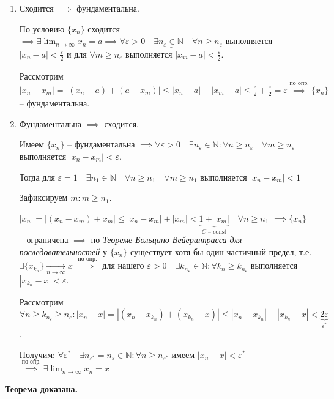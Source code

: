\documentclass[a4paper,oneside]{article}
\newcommand{\bydef}{\stackrel{\text{по опр.}}{\implies}} %
\newcommand{\dslim}{\displaystyle\lim}
\newcommand{\dslimn}{\dslim_{n \to \infty}}
\begin{document}
\begin{enumerate}
    \item Сходится $\implies$ фундаментальна.
    
    По условию $\{x_n\}$ сходится $\implies \exists \dslimn x_n = a
    \implies \underline{\forall \varepsilon > 0 \quad \exists n_\varepsilon \in \mathbb{N} \quad \forall n \ge n_\varepsilon}$
    выполняется $|x_n - a| < \frac{\varepsilon}{2}$ и для $\underline{\forall m \ge n_\varepsilon}$ 
    выполняется $|x_m - a| < \frac{\varepsilon}{2}$.

    Рассмотрим $\underline{|x_n - x_m|} = |(x_n - a) + (a - x_m)| 
    \le |x_n - a| + |x_m - a| \le \frac{\varepsilon}{2} + \frac{\varepsilon}{2} = \varepsilon
    \bydef \{x_n\}$ -- фундаментальна.

    \item Фундаментальна $\implies$ сходится.
    
    Имеем $\{x_n\}$ -- фундаментальна 
    $\implies \forall \varepsilon > 0 \quad \exists n_\varepsilon \in \mathbb{N}:
    \forall n \ge n_\varepsilon \quad \forall m \ge n_\varepsilon$ выполняется
    $|x_n - x_m| < \varepsilon$.

    Тогда для $\varepsilon = 1 \quad \exists n_1 \in \mathbb{N} \quad 
    \forall n \ge n_1 \quad \forall m \ge n_1$ выполняется $|x_n - x_m| < 1$

    Зафиксируем $m: m \ge n_1$.

    $|x_n| = |(x_n - x_m) + x_m| \le |x_n - x_m| + |x_m| < 
    \underbrace{1 + |x_m|}_{C \text{ -- const}} \quad \forall n \ge n_1$
    $\implies \{x_n\}$ -- ограничена $\implies$ по 
    \textit{Теореме Больцано-Вейерштрасса для последовательностей} у $\{x_n\}$
    существует хотя бы один частичный предел, т.е. 
    $\exists \{x_{k_n}\} \underset{n \to \infty}{\to} x$
    $\bydef$ для нашего $\varepsilon > 0 \quad \exists k_{n_\varepsilon} \in \mathbb{N}:
    \forall k_n \ge k_{n_\varepsilon}$ выполняется $|x_{k_n} - x| < \varepsilon$.

    Рассмотрим $\forall n \ge k_{n_\varepsilon} \ge n_\varepsilon:
    |x_n - x| = |(x_n - x_{k_n}) + (x_{k_n} - x)| \le |x_n - x_{k_n}| + |x_{k_n} - x|
    < \underbrace{2 \varepsilon}_{\varepsilon^*}$.

    Получим:
    $\forall \varepsilon^* \quad \exists n_{\varepsilon^*} = n_\varepsilon \in \mathbb{N}:
    \forall n \ge n_{\varepsilon^*}$ имеем $|x_n - x| < \varepsilon^*$
    $\bydef \exists \dslimn x_n = x$
\end{enumerate}
\textbf{Теорема доказана.}
\end{document}
